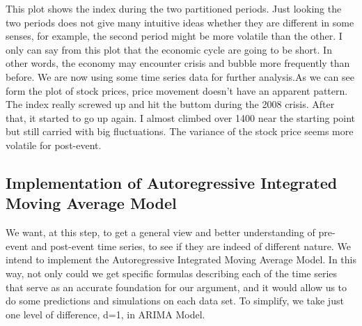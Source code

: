 \documentclass[letterpaper,10pt,english]{/Users/edwsurewin/anaconda/lib/python2.7/site-packages/sphinx/texinputs/sphinxhowto}
\begin{document}
This plot shows the index during the two partitioned periods. Just
looking the two periods does not give many intuitive ideas whether they
are different in some senses, for example, the second period might be
more volatile than the other. I only can say from this plot that the
economic cycle are going to be short. In other words, the economy may
encounter crisis and bubble more frequently than before. We are now
using some time series data for further analysis.As we can see form the plot of stock prices, price movement doesn't have
an apparent pattern. The index really screwed up and hit the buttom
during the 2008 crisis. After that, it started to go up again. I almost
climbed over 1400 near the starting point but still carried with big
fluctuations. The variance of the stock price seems more volatile for
post-event.\subsection{Implementation of Autoregressive Integrated Moving Average
Model}\label{implementation-of-autoregressive-integrated-moving-average-model}We want, at this step, to get a general view and better understanding of
pre-event and post-event time series, to see if they are indeed of
different nature. We intend to implement the Autoregressive Integrated
Moving Average Model. In this way, not only could we get specific
formulas describing each of the time series that serve as an accurate
foundation for our argument, and it would allow us to do some
predictions and simulations on each data set. To simplify, we take just
one level of difference, d=1, in ARIMA Model.

\end{document}
